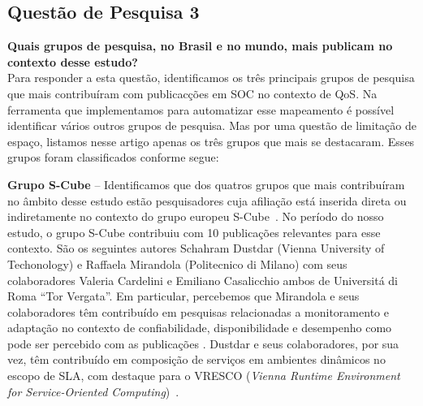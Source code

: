 \subsection{Questão de Pesquisa 3}\label{sec:QP3}

\textbf{Quais grupos de pesquisa, no Brasil e no mundo, mais publicam no contexto desse estudo?}
\\[0.01in]


Para responder a esta quest\~{a}o, identificamos os tr\^{e}s principais grupos de pesquisa que mais contribu\'{i}ram com publicac\c{c}\~{o}es em SOC no contexto de QoS. Na ferramenta que implementamos para automatizar esse mapeamento \'{e} poss\'{i}vel identificar v\'{a}rios outros grupos de pesquisa. Mas por uma quest\~{a}o de limita\c{c}\~{a}o de espa\c{c}o, listamos nesse artigo apenas os tr\^{e}s grupos que mais se destacaram. Esses grupos foram classificados conforme segue: 

\textbf{Grupo S-Cube} -- Identificamos que dos quatros grupos que mais contribu\'{i}ram no \^{a}mbito desse estudo est\~{a}o pesquisadores cuja afilia\c{c}\~{a}o est\'{a} inserida direta ou indiretamente no contexto do grupo europeu S-Cube~\cite{SCube-FINALREPORT}. No per\'{i}odo do nosso estudo, o grupo S-Cube contribuiu com 10 publica\c{c}\~{o}es relevantes para esse contexto. S\~{a}o os seguintes autores Schahram Dustdar (Vienna University of Techonology) e Raffaela Mirandola (Politecnico di Milano) com seus colaboradores Valeria Cardelini e Emiliano Casalicchio ambos de Universit\'{a} di Roma ``Tor Vergata''. Em particular, percebemos que Mirandola e seus colaboradores t\^{e}m contribu\'{i}do em pesquisas relacionadas a monitoramento e adapta\c{c}\~{a}o no contexto de confiabilidade, disponibilidade e desempenho como pode ser percebido com as publica\c{c}\~{o}es \cite{Cardellini:2009:QRA:1595696.1595718, Calinescu:2011:DQM:1990772.1991012, Ardagna:2010:POS:1814581.1814611, 10.1109/TSE.2011.68, Cardellini:2009:TSD:1692867.1692870}. Dustdar e seus colaboradores, por sua vez, t\^{e}m contribu\'{i}do em composi\c{c}\~{a}o de servi\c{c}os em ambientes din\^{a}micos no escopo de SLA, com destaque para o  VRESCO (\emph{Vienna Runtime Environment for Service-Oriented Computing})~\cite{5467022}. 

